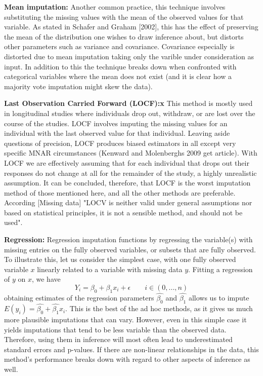 \documentclass{article}
\begin{document}
	\textbf{Mean imputation:}
	Another common practice, this technique involves substituting the missing values with the mean of the observed values for that variable. As stated in Schafer and Graham [2002], this has the effect of preserving the mean of the distribution one wishes to draw inference about, but distorts other parameters such as variance and covariance. Covariance especially is distorted due to mean imputation taking only the varible under consideration as input. In addition to this the technique breaks down when confronted with categorical variables where the mean does not exist (and it is clear how a majority vote imputation might skew the data). %
	
	
	\textbf{Last Observation Carried Forward (LOCF):x}
	This method is mostly used in longitudinal studies where individuals drop out, withdraw, or are lost over the course of the studies. LOCF involves imputing the missing values for an individual with the last observed value for that individual. Leaving aside questions of precision, LOCF produces biased estimators in all except very specific MNAR circumstances (Kenward and Molenberghs 2009 get article). With LOCF we are effectively assuming that for each individual that drops out their responses do not change at all for the remainder of the study, a highly unrealistic assumption. It can be concluded, therefore, that LOCF is the worst imputation method of those mentioned here, and all the other methods are preferable. According [Missing data] "LOCV is neither valid under general assumptions nor based on statistical principles, it is not a sensible method, and should not be used".
	
	\textbf{Regression:}
	Regression imputation functions by regressing the variable(s) with missing entries on the fully observed variables, or subsets that are fully observed. To illustrate this, let us consider the simplest case, with one fully observed variable $x$ linearly related to a variable with missing data $y$. Fitting a regression of $y$ on $x$, we have$$Y_{i} = \beta_{0} + \beta_{1}x_{i} + \epsilon \qquad i\in(0,...,n)$$ obtaining estimates of the regression parameters $\hat{\beta_{0}}$ and $\hat{\beta_{1}}$ allows us to impute $E(y_{i}) = \hat{\beta_{0}} + \hat{\beta_{1}}x_{i}$. This is the best of the ad hoc methods, as it gives us much more plausible imputations that can vary. However, even in this simple case it yields imputations that tend to be less variable than the observed data. Therefore, using them in inference will most often lead to underestimated standard errors and p-values. If there are non-linear relationships in the data, this method's performance breaks down with regard to other aspects of inference as well.
	
\end{document}
